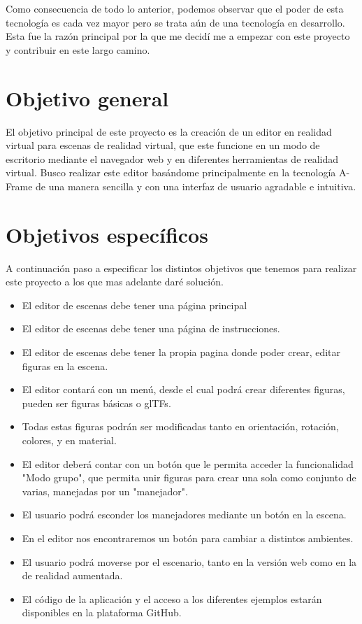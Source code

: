 \documentclass[a4paper, 12pt]{book}
\begin{document}
Como consecuencia de todo lo anterior, podemos observar que el poder de esta tecnología es cada vez mayor pero se trata aún de una tecnología en desarrollo. Esta fue la razón principal por la que me decidí me a empezar con este proyecto y contribuir en este largo camino.

\section{Objetivo general}
\label{sec:objetivo general}

El objetivo principal de este proyecto es la creación de un editor en realidad virtual para escenas de realidad virtual, que este funcione en un modo de escritorio mediante el navegador web y en diferentes herramientas de realidad virtual. Busco realizar este editor basándome principalmente en la tecnología A-Frame de una manera sencilla y con una interfaz de usuario agradable e intuitiva.

\section{Objetivos específicos}
\label{sec:Objetivos específicos}

A continuación paso a especificar los distintos objetivos que tenemos para realizar este proyecto a los que mas adelante daré solución. 

\begin{itemize}
  \item El editor de escenas debe tener una página principal
  \item El editor de escenas debe tener una página de instrucciones.
  \item El editor de escenas debe tener la propia pagina donde poder crear, editar figuras en la escena.
  \item El editor contará con un menú, desde el cual podrá crear diferentes figuras, pueden ser figuras básicas o glTFs.
  \item Todas estas figuras podrán ser modificadas tanto en orientación, rotación, colores, y en material.
  \item El editor deberá contar con un botón que le permita acceder la funcionalidad "Modo grupo", que permita unir figuras para crear una sola como conjunto de varias, manejadas por un "manejador".
  \item El usuario podrá esconder los manejadores mediante un botón en la escena.  
  \item En el editor nos encontraremos un botón para cambiar a distintos ambientes.
  \item El usuario podrá moverse por el escenario, tanto en la versión web como en la de realidad aumentada.
  \item El código de la aplicación y el acceso a los diferentes ejemplos estarán disponibles en la plataforma GitHub.
\end{itemize}
\end{document}
